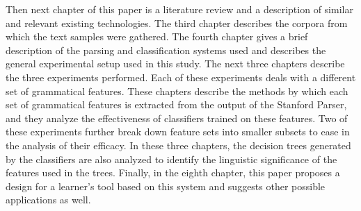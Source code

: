 \documentclass[main.tex]{subfiles}
\begin{document}
Then next chapter of this paper is a literature review and a description of similar and relevant existing technologies. The third chapter describes the corpora from which the text samples were gathered. The fourth chapter gives a brief description of the parsing and classification systems used and describes the general experimental setup used in this study. The next three chapters describe the three experiments performed. Each of these experiments deals with a different set of grammatical features. These chapters describe the methods by which each set of grammatical features is extracted from the output of the Stanford Parser, and they analyze the effectiveness of classifiers trained on these features. Two of these experiments further break down feature sets into smaller subsets to ease in the analysis of their efficacy. In these three chapters, the decision trees generated by the classifiers are also analyzed to identify the linguistic significance of the features used in the trees. Finally, in the eighth chapter, this paper proposes a design for a learner's tool based on this system and suggests other possible applications as well.

\biblio
\end{document}
